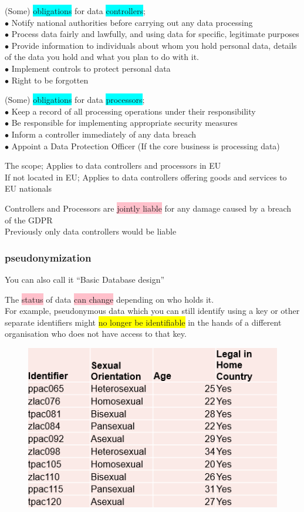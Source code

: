 \documentclass[tikz,border=10pt]{project_plan}
\newcommand{\bulletPoint}{\hspace{-3.1pt}$\bullet$ \hspace{5pt}}
\begin{document}
(Some) \colorbox{cyan}{obligations} for data \colorbox{cyan}{controllers};\\
\bulletPoint Notify national authorities before carrying out any data processing\\
\bulletPoint Process data fairly and lawfully, and using data for specific, legitimate purposes\\
\bulletPoint Provide information to individuals about whom you hold personal data, details of the data you hold and what you plan to do with it.\\
\bulletPoint Implement controls to protect personal data \\
\bulletPoint Right to be forgotten

(Some) \colorbox{cyan}{obligations} for data \colorbox{cyan}{processors};\\
\bulletPoint Keep a record of all processing operations under their responsibility\\
\bulletPoint Be responsible for implementing appropriate security measures\\
\bulletPoint Inform a controller immediately of any data breach\\
\bulletPoint Appoint a Data Protection Officer (If the core business is processing data)


The scope; Applies to data controllers and processors in EU\\
If not located in EU; Applies to data controllers offering goods and services to EU nationals

Controllers and Processors are \colorbox{pink}{jointly liable} for any damage caused by a breach of the GDPR \\
Previously only data controllers would be liable

\subsubsection{pseudonymization}

You can also call it “Basic Database design”

The \colorbox{pink}{status} of data \colorbox{pink}{can change} depending on who holds it.\\
For example, pseudonymous data which you can still identify using a key or other separate
identifiers might \colorbox{yellow}{no longer be identifiable} in the hands of a different organisation who does not have access to that key.

\begin{figure}[H]
  \centering
  \includegraphics[width=.6\linewidth]{pseudonymization.png}
\end{figure}
\end{document}
